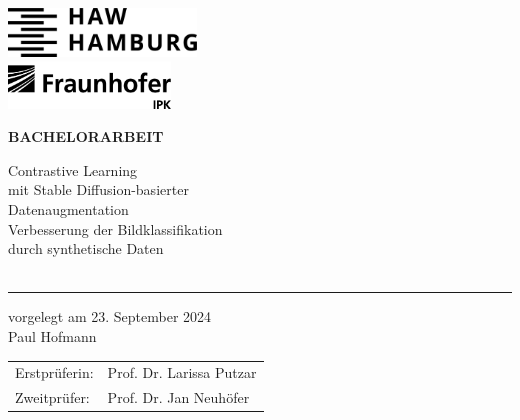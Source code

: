 \begin{titlepage}
  \color{black}
  \raggedright %

  \hspace{\fill}\includegraphics[width=5.00cm]{logo_haw_schwarz.png}\\
  \vspace{0.5cm}
  \hspace{\fill}\includegraphics[width=4.30cm]{logo_fraunhofer-ipk_schwarz.png}\\

  \vspace{5cm}

  \setmainfont{Open Sans} %
  \small\textbf{BACHELORARBEIT}

  \vspace{8mm}

  \begin{minipage}{0.8\linewidth}
    \setmainfont{Martel Heavy} \LARGE
    Contrastive Learning\\[1mm] %
    mit Stable Diffusion-basierter\\[1mm]
    Datenaugmentation\\[4mm]
    \setmainfont{Open Sans} \Large
    Verbesserung der Bildklassifikation\\[1mm]
    durch synthetische Daten\\[1mm]
    \,\rule{11mm}{1.2mm}
  \end{minipage}

  \vspace{9.2mm}

  vorgelegt am 23. September 2024\\
  Paul Hofmann

  \vspace{3cm}

  \hspace*{37mm}
  \begin{minipage}{0.5\linewidth}
    \begin{tabular}{@{}ll}
      Erstprüferin: & Prof. Dr. Larissa Putzar\\[-.3mm]
      Zweitprüfer: & Prof. Dr. Jan Neuhöfer \\
    \end{tabular}\\
	

\end{minipage}
\end{titlepage}
